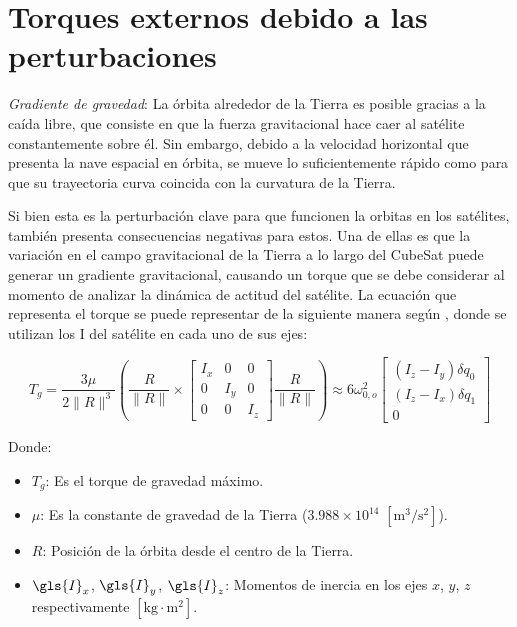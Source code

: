 \section{Torques externos debido a las perturbaciones}

\label{ap:Z2}


\textit{Gradiente de gravedad}: La órbita alrededor de la Tierra es posible gracias a la caída libre, que consiste en que la fuerza gravitacional hace caer al satélite constantemente sobre él. Sin embargo, debido a la velocidad horizontal que presenta la nave espacial en órbita, se mueve lo suficientemente rápido como para que su trayectoria curva coincida con la curvatura de la Tierra.

Si bien esta es la perturbación clave para que funcionen la orbitas en los satélites, también presenta consecuencias negativas para estos. Una de ellas es que la variación en el campo gravitacional de la Tierra a lo largo del CubeSat puede generar un gradiente gravitacional, causando un torque que se debe considerar al momento de analizar la dinámica de actitud del satélite. La ecuación que representa el torque se puede representar de la siguiente manera según \cite{ref5}, donde se utilizan los \gls{I} del satélite en cada uno de sus ejes:

\[
T_g = \frac{3\mu}{2\|R\|^3} \left( \frac{R}{\|R\|} \times \left[ \begin{matrix} 
	I_x & 0 & 0 \\ 
	0 & I_y & 0 \\ 
	0 & 0 & I_z 
\end{matrix} \right] \frac{R}{\|R\|} \right) \approx 6 \omega_{0,o}^2 \left[ \begin{matrix} 
	(I_z - I_y) \delta q_0 \\ 
	(I_z - I_x) \delta q_1 \\ 
	0 
\end{matrix} \right]
\]

Donde:
\begin{itemize}
	\item $T_g$: Es el torque de gravedad máximo.
	\item $\mu$: Es la constante de gravedad de la Tierra ($3.988 \times 10^{14}$ $[\text{m}^3/\text{s}^2]$).
	\item $R$: Posición de la órbita desde el centro de la Tierra.
	\item $\gls{I}_x$, $\gls{I}_y$, $\gls{I}_z$: Momentos de inercia en los ejes $x$, $y$, $z$ respectivamente $[\text{kg} \cdot \text{m}^2]$.
\end{itemize}

